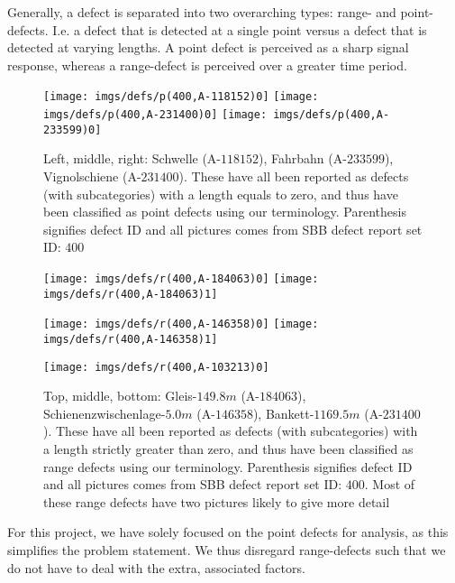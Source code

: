 Generally, a defect is separated into two overarching types: range- and point-defects. I.e. a defect that is detected at a single point versus a defect that is detected at varying lengths. A point defect is perceived as a sharp signal response, whereas a range-defect is perceived over a greater time period. 
\begin{figure}[H]
	\centering
	\texttt{[image: imgs/defs/p(400,A-118152)0]}
	\texttt{[image: imgs/defs/p(400,A-231400)0]}
	\texttt{[image: imgs/defs/p(400,A-233599)0]}
	\caption{Left, middle, right: Schwelle (A-$118152$), Fahrbahn (A-$233599$), Vignolschiene (A-$231400$). These have all been reported as defects (with subcategories) with a length equals to zero, and thus have been classified as point defects using our terminology. Parenthesis signifies defect ID and all pictures comes from SBB defect report set ID: $400$}
\end{figure}
\begin{figure}[H]
	\centering
	\texttt{[image: imgs/defs/r(400,A-184063)0]}
	\texttt{[image: imgs/defs/r(400,A-184063)1]}
	
	\texttt{[image: imgs/defs/r(400,A-146358)0]}
	\texttt{[image: imgs/defs/r(400,A-146358)1]}
\end{figure}
\begin{figure}[H]
	\centering
	\texttt{[image: imgs/defs/r(400,A-103213)0]}
	\caption{Top, middle, bottom: Gleis-$149.8 m$ (A-$184063$), Schienenzwischenlage-$5.0 m$ (A-$146358$), Bankett-$1169.5 m$ (A-$231400$). These have all been reported as defects (with subcategories) with a length strictly greater than zero, and thus have been classified as range defects using our terminology. Parenthesis signifies defect ID and all pictures comes from SBB defect report set ID: $400$. Most of these range defects have two pictures likely to give more detail}
\end{figure}
\raggedbottom %
For this project, we have solely focused on the point defects for analysis, as this simplifies the problem statement. We thus disregard range-defects such that we do not have to deal with the extra, associated factors. 

